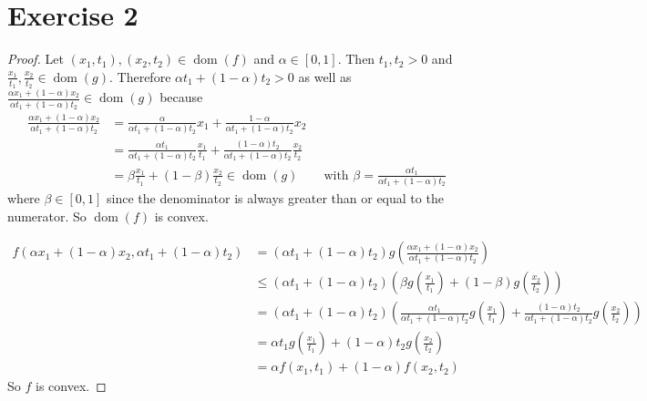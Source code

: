 \documentclass[10pt,a4paper]{article}
\DeclareMathOperator{\dom}{dom}
\begin{document}
\section*{Exercise 2}

\begin{proof}
  Let $(x_{1}, t_{1}), (x_{2}, t_{2}) \in \dom(f)$ and $\alpha \in [0, 1]$.
  Then $t_{1}, t_{2} > 0$ and $\frac{x_{1}}{t_{1}}, \frac{x_{2}}{t_{2}} \in \dom(g)$.
  Therefore $\alpha t_{1} + (1 - \alpha) t_{2} > 0$ as well as $\frac{\alpha x_{1} + (1 - \alpha) x_{2}}{\alpha t_{1} + (1 - \alpha) t_{2}} \in \dom(g)$ because
  \begin{align*}
    \frac{\alpha x_{1} + (1 - \alpha) x_{2}}{\alpha t_{1} + (1 - \alpha) t_{2}} & = \frac{\alpha}{\alpha t_{1} + (1 - \alpha) t_{2}} x_{1} + \frac{1 - \alpha}{\alpha t_{1} + (1 - \alpha) t_{2}} x_{2}\\
                                                                                & = \frac{\alpha t_{1}}{\alpha t_{1} + (1 - \alpha) t_{2}} \frac{x_{1}}{t_{1}} + \frac{(1 - \alpha)t_{2}}{\alpha t_{1} + (1 - \alpha) t_{2}} \frac{x_{2}}{t_{2}}\\
                                                                                & = \beta \frac{x_{1}}{t_{1}} + (1 - \beta) \frac{x_{2}}{t_{2}} \in \dom(g) \qquad \textrm{with $\beta = \frac{\alpha t_{1}}{\alpha t_{1} + (1 - \alpha) t_{2}}$}
  \end{align*}
  where $\beta \in [0, 1]$ since the denominator is always greater than or equal to the numerator.
  So $\dom(f)$ is convex.

  \begin{align*}
    f(\alpha x_{1} + (1 - \alpha)x_{2}, \alpha t_{1} + (1 - \alpha)t_{2}) & = (\alpha t_{1} + (1 - \alpha)t_{2}) g\left( \frac{\alpha x_{1} + (1 - \alpha)x_{2}}{\alpha t_{1} + (1 - \alpha)t_{2}} \right)\\
                                                                          & \le (\alpha t_{1} + (1 - \alpha)t_{2}) \left( \beta g\left( \frac{x_{1}}{t_{1}} \right) + (1 - \beta) g\left( \frac{x_{2}}{t_{2}} \right) \right)\\
                                                                          & = (\alpha t_{1} + (1 - \alpha)t_{2}) \left( \frac{\alpha t_{1}}{\alpha t_{1} + (1 - \alpha) t_{2}} g\left( \frac{x_{1}}{t_{1}} \right) + \frac{(1 - \alpha) t_{2}}{\alpha t_{1} + (1 - \alpha) t_{2}} g\left( \frac{x_{2}}{t_{2}} \right) \right)\\
                                                                          & = \alpha t_{1} g\left( \frac{x_{1}}{t_{1}} \right) + (1 - \alpha) t_{2} g\left( \frac{x_{2}}{t_{2}} \right)\\
                                                                          & = \alpha f(x_{1}, t_{1}) + (1 - \alpha) f(x_{2}, t_{2})
  \end{align*}
  So $f$ is convex.
\end{proof}
\end{document}
